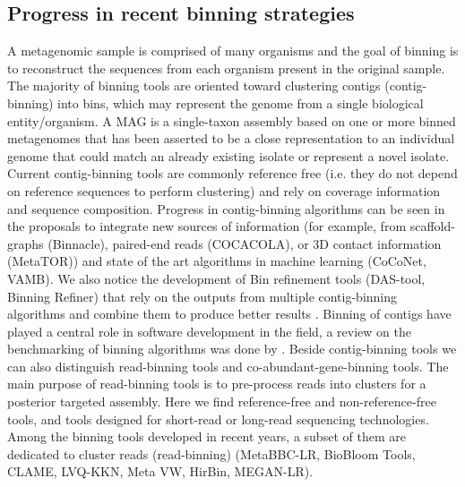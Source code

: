 \documentclass{article}
\begin{document}
\subsection{Progress in recent binning strategies}
A metagenomic sample is comprised of many organisms and the goal of binning is to reconstruct the sequences from each organism present in the original sample.
The majority of binning tools are oriented toward clustering contigs (contig-binning) into bins, which may represent the genome from a single biological entity/organism.
A \gls{MAG} is a single-taxon assembly based on one or more binned metagenomes that has been asserted to be a close representation to an individual genome that could match an already existing isolate or represent a novel isolate.
Current contig-binning tools are commonly reference free (i.e. they do not depend on reference sequences to perform clustering) and rely on coverage information and sequence composition.
Progress in contig-binning algorithms can be seen in the proposals to integrate new sources of information (for example, from scaffold-graphs (Binnacle), paired-end reads (COCACOLA), or 3D contact information (MetaTOR)) and state of the art algorithms in machine learning (CoCoNet, VAMB).
We also notice the development of Bin refinement tools (DAS-tool, Binning Refiner) that rely on the outputs from multiple contig-binning algorithms and combine them to produce better results \cite{sieber2018recovery}.
Binning of contigs have played a central role in software development in the field, a review on the benchmarking of binning algorithms was done by . 
Beside contig-binning tools we can also distinguish read-binning tools and co-abundant-gene-binning tools.
The main purpose of read-binning tools is to pre-process reads into clusters for a posterior targeted assembly.
Here we find reference-free and non-reference-free tools, and tools designed for short-read or long-read sequencing technologies.
Among the binning tools developed in recent years, a subset of them are dedicated to cluster reads (read-binning) (MetaBBC-LR, BioBloom Tools, CLAME, LVQ-KKN, Meta VW, HirBin, MEGAN-LR).
\end{document}
